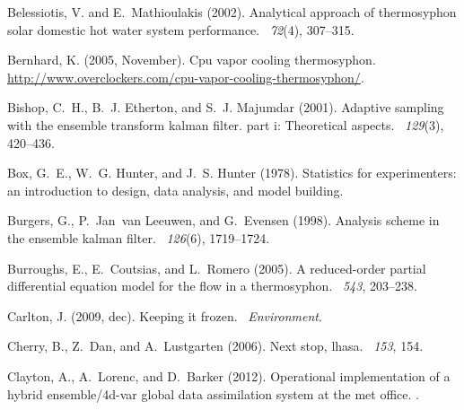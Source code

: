 \documentclass[12pt]{report}
\begin{document}
\begin{thebibliography}{}
Belessiotis, V. and E.~Mathioulakis (2002).
\newblock Analytical approach of thermosyphon solar domestic hot water system
  performance.
~{\em 72\/}(4), 307--315.

Bernhard, K. (2005, November).
\newblock Cpu vapor cooling thermosyphon.
\newblock \url{http://www.overclockers.com/cpu-vapor-cooling-thermosyphon/}.

Bishop, C.~H., B.~J. Etherton, and S.~J. Majumdar (2001).
\newblock Adaptive sampling with the ensemble transform kalman filter. part i:
  Theoretical aspects.
~{\em 129\/}(3), 420--436.

Box, G.~E., W.~G. Hunter, and J.~S. Hunter (1978).
\newblock Statistics for experimenters: an introduction to design, data
  analysis, and model building.

Burgers, G., P.~Jan~van Leeuwen, and G.~Evensen (1998).
\newblock Analysis scheme in the ensemble kalman filter.
~{\em 126\/}(6), 1719--1724.

Burroughs, E., E.~Coutsias, and L.~Romero (2005).
\newblock A reduced-order partial differential equation model for the flow in a
  thermosyphon.
~{\em 543}, 203--238.

Carlton, J. (2009, dec).
\newblock Keeping it frozen.
~{\em Environment}.

Cherry, B., Z.~Dan, and A.~Lustgarten (2006).
\newblock Next stop, lhasa.
~{\em 153}, 154.

Clayton, A., A.~Lorenc, and D.~Barker (2012).
\newblock Operational implementation of a hybrid ensemble/4d-var global data
  assimilation system at the met office.
.


\end{thebibliography}
\end{document}
